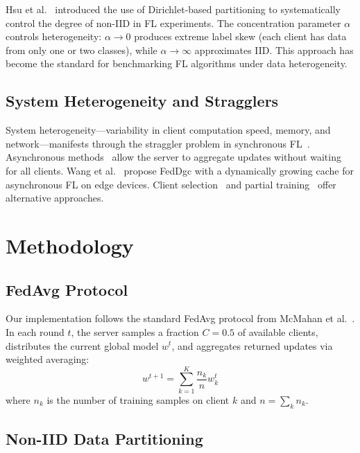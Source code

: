 \documentclass[journal]{IEEEtran}
\begin{document}
Hsu et al.~\cite{hsu2019measuring} introduced the use of Dirichlet-based partitioning to systematically control the degree of non-IID in FL experiments. The concentration parameter $\alpha$ controls heterogeneity: $\alpha \to 0$ produces extreme label skew (each client has data from only one or two classes), while $\alpha \to \infty$ approximates IID. This approach has become the standard for benchmarking FL algorithms under data heterogeneity.

\subsection{System Heterogeneity and Stragglers}

System heterogeneity---variability in client computation speed, memory, and network---manifests through the straggler problem in synchronous FL~\cite{bonawitz2019towards}. Asynchronous methods~\cite{xu2023asynchronous,nguyen2022federated,wu2020safa} allow the server to aggregate updates without waiting for all clients. Wang et al.~\cite{wang2025decentralized} propose FedDgc with a dynamically growing cache for asynchronous FL on edge devices. Client selection~\cite{nishio2019client,lai2021oort} and partial training~\cite{zhang2023timelyfl} offer alternative approaches.


\section{Methodology}
\label{sec:methodology}

\subsection{FedAvg Protocol}

Our implementation follows the standard FedAvg protocol from McMahan et al.~\cite{mcmahan2017communication}. In each round $t$, the server samples a fraction $C = 0.5$ of available clients, distributes the current global model $w^t$, and aggregates returned updates via weighted averaging:
\begin{equation}
    w^{t+1} = \sum_{k=1}^{K} \frac{n_k}{n} w_k^t
\end{equation}
where $n_k$ is the number of training samples on client $k$ and $n = \sum_k n_k$.

\subsection{Non-IID Data Partitioning}
\end{document}
